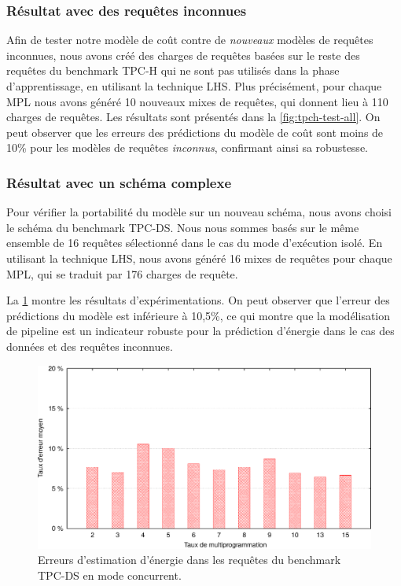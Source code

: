 \subsubsection{Résultat avec des requêtes inconnues}
Afin de tester notre modèle de coût contre de \textit{nouveaux} modèles de requêtes inconnues, nous avons créé des charges de requêtes basées sur le reste des requêtes du benchmark TPC-H qui ne sont pas utilisés dans la phase d'apprentissage, en utilisant la technique LHS. Plus précisément, pour chaque MPL nous avons généré 10 nouveaux mixes de requêtes, qui donnent lieu à 110 charges de requêtes.
 Les résultats sont présentés dans la \ref{fig:tpch-test-all}. On peut observer que les erreurs des prédictions du modèle de coût sont moins de 10\% pour les modèles de requêtes \textit{inconnus}, confirmant ainsi sa robustesse. %

\subsubsection{Résultat avec un schéma complexe}
Pour vérifier la portabilité du modèle sur un nouveau schéma, nous avons choisi le schéma du benchmark TPC-DS. Nous nous sommes basés sur le même ensemble de 16 requêtes sélectionné dans le cas du mode d'exécution isolé. En utilisant la technique LHS, nous avons généré 16 mixes de requêtes pour chaque MPL, qui se traduit par 176 charges de requête. %

La \ref{fig:tpcds-test-unknown} montre les résultats d'expérimentations. On peut observer que l'erreur des prédictions du modèle est inférieure à 10,5\%, ce qui montre que la modélisation de pipeline est un indicateur robuste pour la prédiction d'énergie dans le cas des données et des requêtes inconnues.

\begin{figure}
 \centering
 \includegraphics[scale=0.6]{chapitre4/chap4Fig/tpcds-test-unknown.eps}
 \caption{Erreurs d'estimation d'énergie dans les requêtes du benchmark TPC-DS en mode concurrent.}
 \label{fig:tpcds-test-unknown}
\end{figure}

